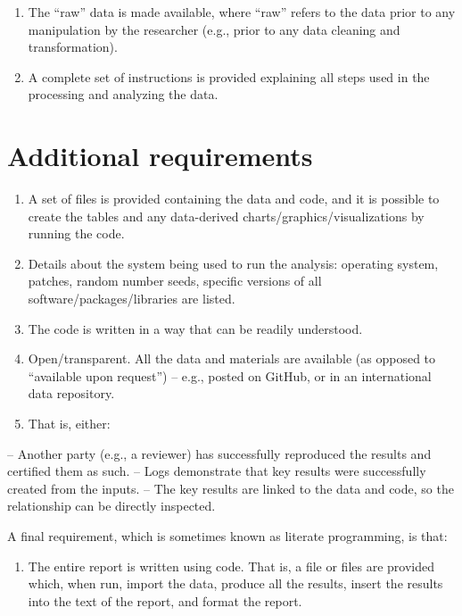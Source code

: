 \documentclass[]{book}
\providecommand{\tightlist}{%
  \setlength{\itemsep}{0pt}\setlength{\parskip}{0pt}}
\begin{document}
\begin{enumerate}
\def\labelenumi{\arabic{enumi})}
\tightlist
\item
  The ``raw'' data is made available, where ``raw'' refers to the data prior to any manipulation by the researcher (e.g., prior to any data cleaning and transformation).
\item
  A complete set of instructions is provided explaining all steps used in the processing and analyzing the data.
\end{enumerate}

\hypertarget{additional-requirements}{%
\section{Additional requirements}\label{additional-requirements}}

\begin{enumerate}
\def\labelenumi{\alph{enumi})}
\item
  A set of files is provided containing the data and code, and it is possible to create the tables and any data-derived charts/graphics/visualizations by running the code.
\item
  Details about the system being used to run the analysis: operating system, patches, random number seeds, specific versions of all software/packages/libraries are listed.
\item
  The code is written in a way that can be readily understood.
\item
  Open/transparent. All the data and materials are available (as opposed to ``available upon request'') -- e.g., posted on GitHub, or in an international data repository.
\item
  That is, either:
\end{enumerate}

-- Another party (e.g., a reviewer) has successfully reproduced the results and certified them as such.
-- Logs demonstrate that key results were successfully created from the inputs.
-- The key results are linked to the data and code, so the relationship can be directly inspected.

A final requirement, which is sometimes known as literate programming, is that:

\begin{enumerate}
\def\labelenumi{\alph{enumi})}
\setcounter{enumi}{5}
\tightlist
\item
  The entire report is written using code. That is, a file or files are provided which, when run, import the data, produce all the results, insert the results into the text of the report, and format the report.
\end{enumerate}
\end{document}
